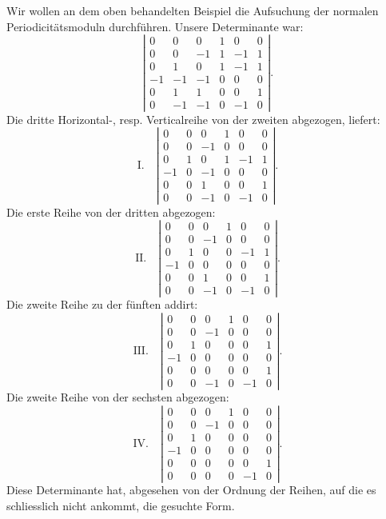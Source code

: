 \documentclass[10pt]{article}
\begin{document}
Wir wollen an dem oben behandelten Beispiel die Aufsuchung der normalen Periodicitätsmoduln durchführen. Unsere Determinante war:
\[
\left|\begin{array}{rrrrrr}
0&0&0&1&0&0\\
0&0&-1&1&-1&1\\
0&1&0&1&-1&1\\
-1&-1&-1&0&0&0\\
0&1&1&0&0&1\\
0&-1&-1&0&-1&0
\end{array}\right|.
\]
Die dritte Horizontal-, resp. Verticalreihe von der zweiten abgezogen, liefert:
\[
\mathrm{I.}\quad
\left|\begin{array}{rrrrrr}
0&0&0&1&0&0\\
0&0&-1&0&0&0\\
0&1&0&1&-1&1\\
-1&0&-1&0&0&0\\
0&0&1&0&0&1\\
0&0&-1&0&-1&0
\end{array}\right|.
\]
Die erste Reihe von der dritten abgezogen:
\[
\mathrm{II.}\quad
\left|\begin{array}{rrrrrr}
0&0&0&1&0&0\\
0&0&-1&0&0&0\\
0&1&0&0&-1&1\\
-1&0&0&0&0&0\\
0&0&1&0&0&1\\
0&0&-1&0&-1&0
\end{array}\right|.
\]
Die zweite Reihe zu der fünften addirt:
\[
\mathrm{III.}\quad
\left|\begin{array}{rrrrrr}
0&0&0&1&0&0\\
0&0&-1&0&0&0\\
0&1&0&0&0&1\\
-1&0&0&0&0&0\\
0&0&0&0&0&1\\
0&0&-1&0&-1&0
\end{array}\right|.
\]
Die zweite Reihe von der sechsten abgezogen:
\[
\mathrm{IV.}\quad
\left|\begin{array}{rrrrrr}
0&0&0&1&0&0\\
0&0&-1&0&0&0\\
0&1&0&0&0&0\\
-1&0&0&0&0&0\\
0&0&0&0&0&1\\
0&0&0&0&-1&0
\end{array}\right|.
\]
Diese Determinante hat, abgesehen von der Ordnung der Reihen, auf die es schliesslich nicht ankommt, die gesuchte Form.
\end{document}
